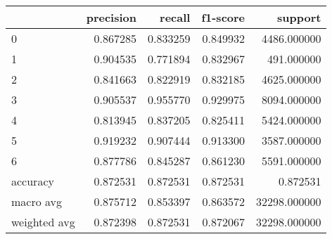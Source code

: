 \begin{tabular}{lrrrr}
\toprule
{} &  precision &    recall &  f1-score &       support \\
\midrule
0            &   0.867285 &  0.833259 &  0.849932 &   4486.000000 \\
1            &   0.904535 &  0.771894 &  0.832967 &    491.000000 \\
2            &   0.841663 &  0.822919 &  0.832185 &   4625.000000 \\
3            &   0.905537 &  0.955770 &  0.929975 &   8094.000000 \\
4            &   0.813945 &  0.837205 &  0.825411 &   5424.000000 \\
5            &   0.919232 &  0.907444 &  0.913300 &   3587.000000 \\
6            &   0.877786 &  0.845287 &  0.861230 &   5591.000000 \\
accuracy     &   0.872531 &  0.872531 &  0.872531 &      0.872531 \\
macro avg    &   0.875712 &  0.853397 &  0.863572 &  32298.000000 \\
weighted avg &   0.872398 &  0.872531 &  0.872067 &  32298.000000 \\
\bottomrule
\end{tabular}
